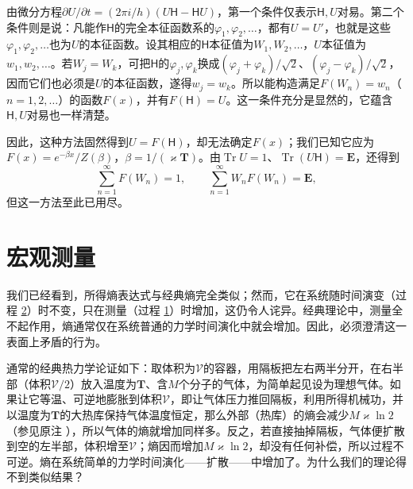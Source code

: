 \documentclass[fontsize=13pt,twoside,openany,headings=normal,parskip=false,bookmarkpackage=false,DIV=calc]{scrbook}
\begin{document}
由微分方程$\partial U/\partial t=(2\pi i/h)(U\mathsf{H}-\mathsf{H}U)$，第一个条件仅表示$\mathsf{H},\allowbreak U$对易。第二个条件则是说：凡能作$\mathsf{H}$的完全本征函数系的$\varphi_1,\allowbreak \varphi_2,\allowbreak \ldots$，都有$U=U'$，也就是这些$\varphi_1,\allowbreak \varphi_2,\allowbreak \ldots$也为$U$的本征函数。设其相应的$\mathsf{H}$本征值为$W_1,\allowbreak W_2,\allowbreak \ldots$，$U$本征值为$w_1,\allowbreak w_2,\allowbreak \ldots$。若$W_j=W_k$，可把$\mathsf{H}$的$\varphi_j,\allowbreak \varphi_k$换成$(\varphi_j+\varphi_k)/\sqrt2$、$(\varphi_j-\varphi_k)/\sqrt2$，因而它们也必须是$U$的本征函数，遂得$w_j=w_k$。所以能构造满足$F(W_n)=w_n$\hypertarget{origpage-212}{}\label{origpage-212}（$n=1,\allowbreak 2,\allowbreak \ldots$）的函数$F(x)$，并有$F(\mathsf{H})=U$。这一条件充分是显然的，它蕴含$\mathsf{H},\allowbreak U$对易也一样清楚。

因此，这种方法固然得到$U=F(\mathsf{H})$，却无法确定$F(x)$；我们已知它应为$F(x)=e^{-\beta x}/Z(\beta)$，$\beta=1/(\varkappa\mathbf T)$。由$\operatorname{Tr}U=1$、$\operatorname{Tr}(U\mathsf{H})=\mathbf E$，还得到
\[
\sum_{n=1}^{\infty}F(W_n)=1,\qquad
\sum_{n=1}^{\infty}W_nF(W_n)=\mathbf E,
\]
但这一方法至此已用尽。

\section{宏观测量}\label{sec:V.4}
我们已经看到，所得熵表达式与经典熵完全类似；然而，它在系统随时间演变（过程 \hyperref[eq:V.1.2]{2}）时不变，只在测量（过程 \hyperref[eq:V.1.1]{1}）时增加，这仍令人诧异。经典理论中，测量全不起作用，熵通常仅在系统普通的力学时间演化中就会增加。因此，必须澄清这一表面上矛盾的行为。

通常的经典热力学论证如下：取体积为$\mathcal V$的容器，用隔板把左右两半分开，在右半部（体积$\mathcal V/2$）放入温度为$\mathbf T$、含$M$个分子的气体，为简单起见设为理想气体。如果让它等温、可逆地膨胀到体积$\mathcal V$，即让气体压力推回隔板，利用所得机械功，并以温度为$\mathbf T$的大热库保持气体温度恒定，那么外部（热库）的熵会减少$M\varkappa\ln2$（参见原注 \hyperlink{note-195}{}），所以气体的熵就增加同样多。反之，若直接抽掉隔板，气体便扩散到空的左半部，体积增至$\mathcal V$；熵因而增加$M\varkappa\ln2$，却没有任何补偿，所以过程不可逆。熵在系统简单的力学时间演化——扩散——中增加了。为什么我们的理论得不到类似结果？
\end{document}
